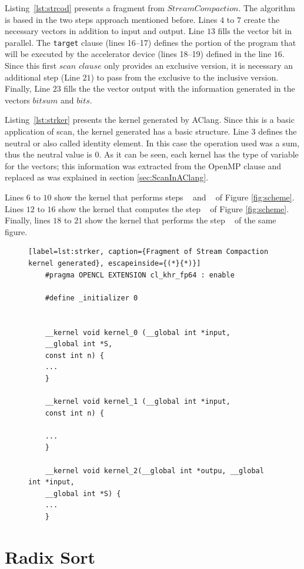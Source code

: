\documentclass[Ingles]{ic-tese-v1}
\newcommand{\ttt}[1]{{\texttt{#1}}}
\newcommand{\rlst}[1]{Listing~\ref{lst:#1}}
\begin{document}
\rlst{strcod}  presents a fragment from $Stream Compaction$. The algorithm is based in the two steps approach mentioned before.
Lines $4$ to $7$ create the necessary vectors in addition to input and output.
Line $13$ fills the vector bit in parallel. The \ttt{target} clause (lines 16--17) defines the portion of the program  that will be executed by the accelerator device (lines 18--19) defined in the line $16$.
Since this first $scan$ $clause$ only provides an exclusive version, it is necessary an additional step (Line $21$) to pass from the exclusive to the inclusive version. Finally, Line $23$ fills the the vector output with the information generated in the vectors $bitsum$ and $bits$.

\rlst{strker} presents the kernel generated by AClang. Since this is  a basic application of scan, the kernel generated has a basic structure. Line $3$ defines the neutral or also called identity element. In this case the operation used was a sum, thus the neutral value is $0$. As it can be seen, each kernel has the type of variable for the vectors; this information was extracted from the OpenMP clause and replaced as was explained in  section \ref{sec:ScanInAClang}.

Lines $6$ to $10$ show the kernel that performs steps ~ and ~ of Figure \ref{fig:scheme}. Lines $12$ to $16$ show the kernel that computes the step ~ of Figure \ref{fig:scheme}. Finally, lines $18$ to $21$ show the kernel that performs the step ~ of the same figure.

\begin{figure}[t]
	\lstset{basicstyle=\scriptsize}
	\begin{lstlisting}[label=lst:strker, caption={Fragment of Stream Compaction kernel generated}, escapeinside={(*}{*)}]
	#pragma OPENCL EXTENSION cl_khr_fp64 : enable

	#define _initializer 0


	__kernel void kernel_0 (__global int *input,
	__global int *S,
	const int n) {
	...
	}

	__kernel void kernel_1 (__global int *input,
	const int n) {

	...
	}

	__kernel void kernel_2(__global int *outpu, __global int *input,
	__global int *S) {
	...
	}
	\end{lstlisting}
\end{figure}

\section{Radix Sort}
\label{sec:Quicksort}
\end{document}

